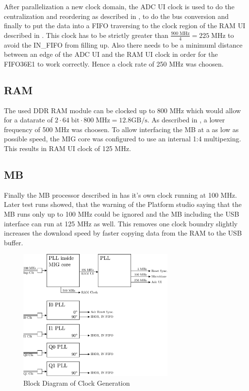 After parallelization a new clock domain, the \gls{ADC} \gls{UI} clock
is used to do the centralization and reordering as described in
,
to do the bus conversion and finally to put the data into a \gls{FIFO}
traversing to the clock region of the \gls{RAM} \gls{UI} described
in . This clock has to be strictly greater than
$\frac{900\;\text{MHz}}{4} = 225\;\text{MHz}$ to avoid the
IN\_FIFO from filling up. Also there needs to be a minimuml
distance between an edge of the \gls{ADC} \gls{UI} and the
\gls{RAM} \gls{UI} clock in order for the FIFO36E1 to work correctly.
Hence a clock rate of 250 MHz was choosen. \\

\subsection{\gls{RAM}}
\label{sec:fpga_clock_ram}
The used \gls{DDR} \gls{RAM} module can be clocked up to 800 MHz which would
allow for a datarate of
$2 \cdot 64\;\text{bit} \cdot 800\;\text{MHz} = 12.8 \text{GB} / \text{s}$.
As described in , a lower frequency of 500 MHz
was choosen. To allow interfacing the \gls{MB} at a as low as possible speed,
the \gls{MIG} core was configured to use an internal 1:4 multipexing. This results
in \gls{RAM} \gls{UI} clock of 125 MHz.

\subsection{\acrfull{MB}}
Finally the \gls{MB} processor described in  has
it's own clock running at 100 MHz. \\

Later test runs showed, that the warning of the Platform studio saying that the
\gls{MB} runs only up to 100 MHz could be ignored and the \gls{MB} including
the \gls{USB} interface can run at 125 MHz as well. This removes one clock boundry
slightly increases the download speed by faster copying data from the
\gls{RAM} to the \gls{USB} buffer. \\

\begin{figure}
  \centering
  \includegraphics[width=0.7\textwidth]{figures/clock_generation}
  \caption{Block Diagram of Clock Generation}
  \label{fig:fpga_clock_generation}
\end{figure}

